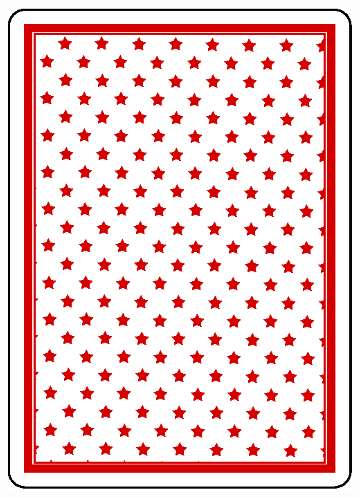 \documentclass[10pt]{beamer}
\begin{document}
\begin{frame}
\begin{columns}
\begin{column}{7cm}
\begin{figure}
\begin{subfigure}{.15\linewidth}
      \includegraphics[width=\linewidth]{im/back.eps}
     \end{subfigure}
    \end{figure}
  \end{column}
 \end{columns}
\end{frame}
\end{document}
